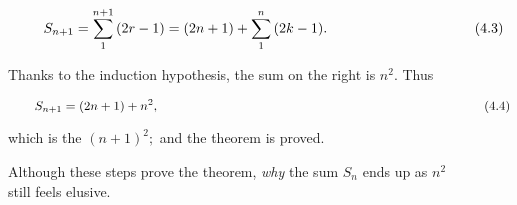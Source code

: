 \documentclass [a4paper]{article}
\begin{document}
$$\hspace*{2em} S_{n+1} = \sum_{1}^{n+1}{(2r-1)} = (2n + 1) + \sum_{1}^{n}{(2k-1). \hspace*{3.7cm} (4.3)}$$
\begin{justify}
Thanks to the induction hypothesis, the sum on the right is $n^2$. Thus
\end{justify}
$$\hspace*{2em} S_{n+1} = (2n+1) + n^2, \hspace*{9cm} (4.4)$$
\begin{justify}
which is the $(n + 1)^2;$ and the theorem is proved.
\end{justify}
\begin{justify}
\hspace*{-1.5em} Although these steps prove the theorem, \textit{why} the sum $S_n$ ends up as $n^2$\\ \hspace*{-1.5em} still feels elusive.
\end{justify}
\end{document}
